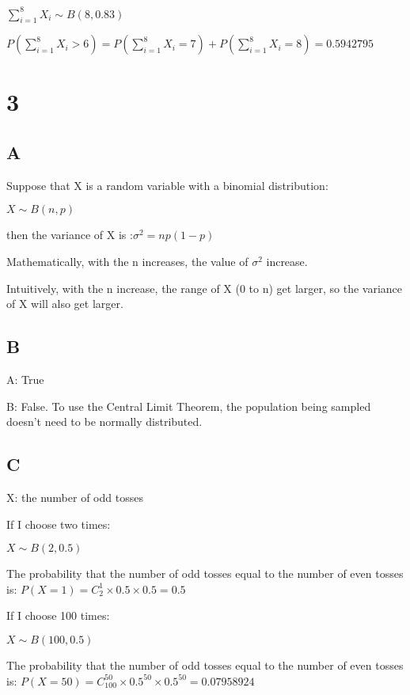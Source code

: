 \documentclass{article}
\begin{document}
	$\sum_{i=1}^{8} X_i\sim B(8,0.83)$
	
	$P(\sum_{i=1}^{8} X_i>6)=P(\sum_{i=1}^{8} X_i=7)+P(\sum_{i=1}^{8} X_i=8)=0.5942795$
	
	\section*{3}
	
	\subsection*{A}
	
	Suppose that X is a random variable with a binomial distribution:
	
	$X\sim B(n,p)$
	
	then the variance of X is :$\sigma^2=np(1-p)$
	
	Mathematically, with the n increases, the value of $\sigma^2$ increase.
	
	Intuitively, with the n increase, the range of X (0 to n) get larger, so the variance of X will also get larger.
	
	\subsection*{B}\noindent
	
	A: True
	
	B: False. To use the Central Limit Theorem, the population being sampled doesn't need to be normally distributed.
	
	\subsection*{C}
	
	X: the number of odd tosses
	
	If I choose two times:
	
	$X\sim B(2,0.5)$
	
	The probability that the number of odd tosses equal to the number of even tosses is:
	$P(X=1)=C_2^1\times 0.5\times 0.5=0.5$
	
	\hspace*{\fill}
	
	If I choose 100 times:
	
	$X\sim B(100,0.5)$
	
	The probability that the number of odd tosses equal to the number of even tosses is:
	$P(X=50)=C_{100}^{50}\times 0.5^{50}\times 0.5^{50}=0.07958924$
	
\end{document}

